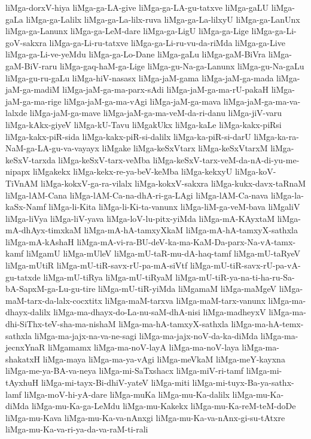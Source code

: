 {liMga-dorxV-hiya
liMga-ga-LA-give
liMga-ga-LA-gu-tatxve
liMga-gaLU
liMga-gaLa
liMga-ga-Lalilx
liMga-ga-La-lilx-ruva
liMga-ga-La-lilxyU
liMga-ga-LanUnx
liMga-ga-Lanunx
liMga-ga-LeM-dare
liMga-ga-LigU
liMga-ga-Lige
liMga-ga-Li-goV-sakxra
liMga-ga-Li-ru-tatxve
liMga-ga-Li-ru-vu-da-riMda
liMga-ga-Live
liMga-ga-Li-ve-yeMdu
liMga-ga-Lo-Dane
liMga-gaLu
liMga-gaM-BiVra
liMga-gaM-BiV-raru
liMga-gaq-haM-ga-Lige
liMga-gu-Na-ga-Lanunx
liMga-gu-Na-gaLu
liMga-gu-ru-gaLu
liMga-hiV-nasasx
liMga-jaM-gama
liMga-jaM-ga-mada
liMga-jaM-ga-madiM
liMga-jaM-ga-ma-parx-sAdi
liMga-jaM-ga-ma-rU-pakaH
liMga-jaM-ga-ma-rige
liMga-jaM-ga-ma-vAgi
liMga-jaM-ga-mava
liMga-jaM-ga-ma-va-lalxde
liMga-jaM-ga-mave
liMga-jaM-ga-ma-veM-da-ri-danu
liMga-jiV-varu
liMga-kAkx-giyeV
liMga-kU-Tavu
liMgakUkx
liMga-kaLe
liMga-kakx-piRsi
liMga-kakx-piR-sida
liMga-kakx-piR-si-dalilx
liMga-ka-piR-si-darU
liMga-ka-ra-NaM-ga-LA-gu-va-vayayx
liMgake
liMga-keSxVtarx
liMga-keSxVtarxM
liMga-keSxV-tarxda
liMga-keSxV-tarx-veMba
liMga-keSxV-tarx-veM-da-nA-di-yu-me-nipapx
liMgakekx
liMga-kekx-re-ya-beV-keMba
liMga-kekxyU
liMga-koV-TiVnAM
liMga-kokxV-ga-ra-vilalx
liMga-kokxV-sakxra
liMga-kukx-davx-taRnaM
liMga-lAM-Cana
liMga-lAM-Ca-na-dhA-ri-ga-LAgi
liMga-lAM-Ca-nava
liMga-la-kaSx-Namf
liMga-li-Kita
liMga-li-Ki-ta-vanunx
liMga-liM-ga-veM-bava
liMgaliV
liMga-liVya
liMga-liV-yava
liMga-loV-lu-pitx-yiMda
liMga-mA-KAyxtaM
liMga-mA-dhAyx-timxkaM
liMga-mA-hA-tamxyXkaM
liMga-mA-hA-tamxyX-sathxla
liMga-mA-kAshaH
liMga-mA-vi-ra-BU-deV-ka-ma-KaM-Da-parx-Na-vA-tamx-kamf
liMgamU
liMga-mUleV
liMga-mU-taR-mu-dA-haq-tamf
liMga-mU-taRyeV
liMga-mUtiR
liMga-mU-tiR-savx-rU-pa-mA-siVtf
liMga-mU-tiR-savx-rU-pa-vA-gu-tatxde
liMga-mU-tiRya
liMga-mU-tiRyaM
liMga-mU-tiR-ya-na-ti-ha-ru-Sa-bA-SapxM-ga-Lu-gu-tire
liMga-mU-tiR-yiMda
liMgamaM
liMga-maMgeV
liMga-maM-tarx-da-lalx-cocxtitx
liMga-maM-tarxva
liMga-maM-tarx-vanunx
liMga-ma-dhayx-dalilx
liMga-ma-dhayx-do-La-nu-saM-dhA-nisi
liMga-madheyxV
liMga-ma-dhi-SiThx-teV-sha-ma-nishaM
liMga-ma-hA-tamxyX-sathxla
liMga-ma-hA-temx-sathxla
liMga-ma-jajx-na-va-ne-sagi
liMga-ma-jajx-noV-da-ka-diMda
liMga-ma-jecnxYnaR
liMgamamx
liMga-ma-noV-layA
liMga-ma-noV-laya
liMga-ma-shakatxH
liMga-maya
liMga-ma-ya-vAgi
liMga-meVkaM
liMga-meY-kayxna
liMga-me-ya-BA-va-neya
liMga-mi-SaTxshacx
liMga-miV-ri-tamf
liMga-mi-tAyxhuH
liMga-mi-tayx-Bi-dhiV-yateV
liMga-miti
liMga-mi-tuyx-Ba-ya-sathx-lamf
liMga-moV-hi-yA-dare
liMga-muKa
liMga-mu-Ka-dalilx
liMga-mu-Ka-diMda
liMga-mu-Ka-ga-LeMdu
liMga-mu-Kakekx
liMga-mu-Ka-reM-teM-doDe
liMga-mu-Kava
liMga-mu-Ka-va-nAnxgi
liMga-mu-Ka-va-nAnx-gi-su-tAtxre
liMga-mu-Ka-va-ri-ya-da-va-raM-ti-rali
}
